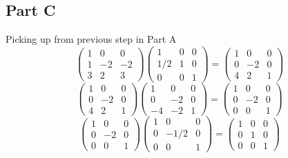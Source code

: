 \documentclass{article}
\begin{document}
\subsection*{Part C}

Picking up from previous step in Part A
\[
    \begin{pmatrix}
        1 & 0 & 0 \\
        1 & -2 & -2 \\
        3 & 2 & 3
    \end{pmatrix}
    \begin{pmatrix}
        1 & 0 & 0 \\
        1/2 & 1 & 0 \\
        0 & 0 & 1
    \end{pmatrix}
    =
    \begin{pmatrix}
        1 & 0 & 0 \\
        0 & -2 & 0 \\
        4 & 2 & 1
    \end{pmatrix}
\]
\[
    \begin{pmatrix}
        1 & 0 & 0 \\
        0 & -2 & 0 \\
        4 & 2 & 1
    \end{pmatrix}
    \begin{pmatrix}
        1 & 0 & 0 \\
        0 & -2 & 0 \\
        -4 & -2 & 1
    \end{pmatrix}
    =
    \begin{pmatrix}
        1 & 0 & 0 \\
        0 & -2 & 0 \\
        0 & 0 & 1
    \end{pmatrix}
\]
\[
    \begin{pmatrix}
        1 & 0 & 0 \\
        0 & -2 & 0 \\
        0 & 0 & 1
    \end{pmatrix}
    \begin{pmatrix}
        1 & 0 & 0 \\
        0 & -1/2 & 0 \\
        0 & 0 & 1
    \end{pmatrix}
    =
    \begin{pmatrix}
        1 & 0 & 0 \\
        0 & 1 & 0 \\
        0 & 0 & 1
    \end{pmatrix}
\]
\end{document}
